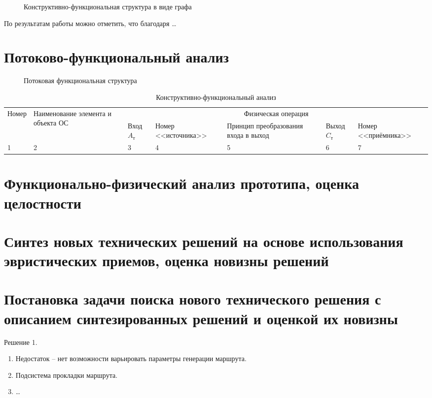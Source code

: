 \begin{figure}[h!]
    \caption{Конструктивно-функциональная структура в виде графа}
\end{figure}

По результатам работы можно отметить, что благодаря \ldots

\chapter{Потоково-функциональный анализ}

\begin{figure}[h!]
    \caption{Потоковая функциональная структура}
\end{figure}

\begin{table}[h]
    \center
    \caption{Конструктивно-функциональный анализ}
    \begin{tabularx}{\textwidth}{|X|X|X|X|X|X|X|}
        \hline
        \multirow{2}{*}{Номер} & \multirow{2}{*}{Наименование элемента и объекта ОС} & \multicolumn{5}{|c|}{Физическая операция} \\ \cline{3-7}
        & & Вход \( A_\text{т} \) & Номер <<источника>> & Принцип преобразования входа в выход & Выход \( C_\text{т} \) & Номер <<приёмника>> \\ \hline
        1 & 2 & 3 & 4 & 5 & 6 & 7 \\ \hline
    \end{tabularx}
\end{table}

\chapter{Функционально-физический анализ прототипа, оценка целостности}
\chapter{Синтез новых технических решений на основе использования эвристических приемов, 
    оценка новизны решений}
\chapter{Постановка задачи поиска нового технического решения с описанием синтезированных решений и 
    оценкой их новизны}
Решение 1.
\begin{enumerate}
    \item Недостаток -- нет возможности варьировать параметры генерации маршрута.
    \item Подсистема прокладки маршрута.
    \item \ldots
\end{enumerate}

